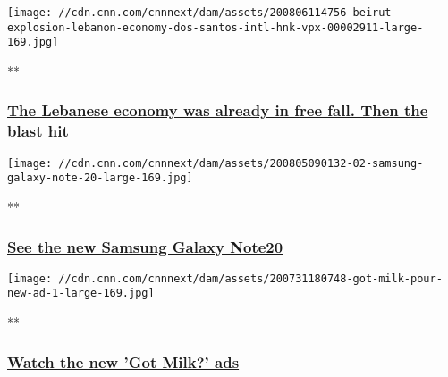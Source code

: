 \href{/videos/business/2020/08/06/beirut-explosion-lebanon-economy-dos-santos-intl-hnk-vpx.cnn/video/playlists/business-news/}{}

\texttt{[image: //cdn.cnn.com/cnnnext/dam/assets/200806114756-beirut-explosion-lebanon-economy-dos-santos-intl-hnk-vpx-00002911-large-169.jpg]}

**

\hypertarget{the-lebanese-economy-was-already-in-free-fall-then-the-blast-hit}{%
\subsubsection{\texorpdfstring{\href{/videos/business/2020/08/06/beirut-explosion-lebanon-economy-dos-santos-intl-hnk-vpx.cnn/video/playlists/business-news/}{The
Lebanese economy was already in free fall. Then the blast
hit}}{The Lebanese economy was already in free fall. Then the blast hit}}\label{the-lebanese-economy-was-already-in-free-fall-then-the-blast-hit}}

\href{/videos/business/2020/08/05/samsung-galaxy-note20-orig.cnn-business/video/playlists/business-news/}{}

\texttt{[image: //cdn.cnn.com/cnnnext/dam/assets/200805090132-02-samsung-galaxy-note-20-large-169.jpg]}

**

\hypertarget{see-the-new-samsung-galaxy-note20}{%
\subsubsection{\texorpdfstring{\href{/videos/business/2020/08/05/samsung-galaxy-note20-orig.cnn-business/video/playlists/business-news/}{See
the new Samsung Galaxy
Note20}}{See the new Samsung Galaxy Note20}}\label{see-the-new-samsung-galaxy-note20}}

\href{/videos/business/2020/07/31/got-milk-new-ads-zw-orig.cnn-business/video/playlists/business-news/}{}

\texttt{[image: //cdn.cnn.com/cnnnext/dam/assets/200731180748-got-milk-pour-new-ad-1-large-169.jpg]}

**

\hypertarget{watch-the-new-got-milk-ads}{%
\subsubsection{\texorpdfstring{\href{/videos/business/2020/07/31/got-milk-new-ads-zw-orig.cnn-business/video/playlists/business-news/}{Watch
the new 'Got Milk?'
ads}}{Watch the new 'Got Milk?' ads}}\label{watch-the-new-got-milk-ads}}

